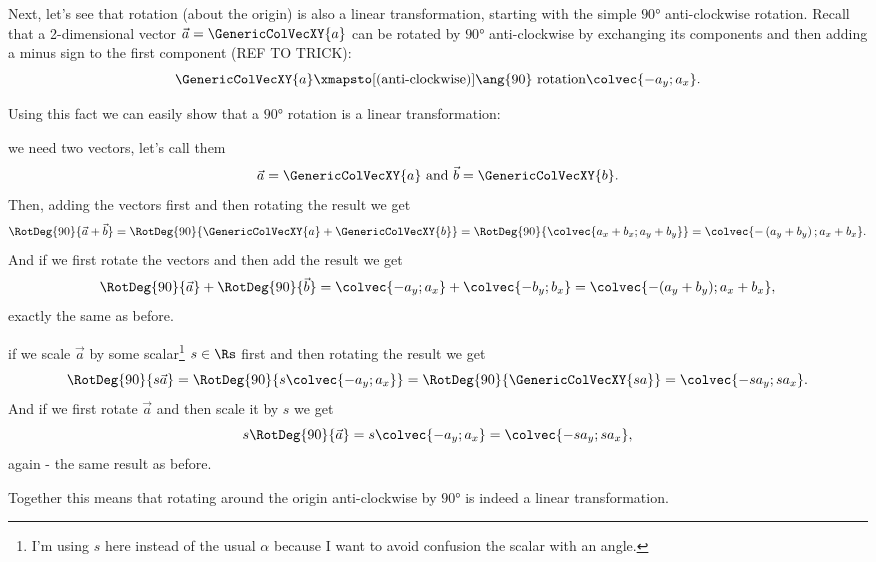 Next, let's see that rotation (about the origin) is also a linear transformation, starting with the simple $\ang{90}$ anti-clockwise rotation. Recall that a 2-dimensional vector $\vec{a}=\GenericColVecXY{a}$ can be rotated by $\ang{90}$ anti-clockwise by exchanging its components and then adding a minus sign to the first component (REF TO TRICK):
\begin{equation*}
	\GenericColVecXY{a} \xmapsto[\text{(anti-clockwise)}]{\ang{90}\ \text{rotation}} \colvec{-a_{y};a_{x}}.
\end{equation*}

Using this fact we can easily show that a $\ang{90}$ rotation is a linear transformation:
\begin{descitemize}
	\item[Additivity] we need two vectors, let's call them $$\vec{a}=\GenericColVecXY{a}\ \text{and}\ \vec{b}=\GenericColVecXY{b}.$$ Then, adding the vectors first and then rotating the result we get
	\begin{equation*}
		\RotDeg{90}{\vec{a}+\vec{b}} = \RotDeg{90}{\GenericColVecXY{a}+\GenericColVecXY{b}}
		= \RotDeg{90}{\colvec{a_{x}+b_{x};a_{y}+b_{y}}}
		= \colvec{-\left(a_{y}+b_{y}\right);a_{x}+b_{x}}.
	\end{equation*}
	And if we first rotate the vectors and then add the result we get
	\begin{equation*}
		\RotDeg{90}{\vec{a}} + \RotDeg{90}{\vec{b}} = \colvec{-a_{y};a_{x}}+\colvec{-b_{y};b_{x}} = \colvec{-(a_{y}+b_{y});a_{x}+b_{x}},
	\end{equation*}
	exactly the same as before.

	\item[Homogeneity] if we scale $\vec{a}$ by some scalar\footnote{I'm using $s$ here instead of the usual $\alpha$ because I want to avoid confusion the scalar with an angle.} $s\in\Rs$ first and then rotating the result we get
	\begin{equation*}
		\RotDeg{90}{s\vec{a}} = \RotDeg{90}{s\colvec{-a_{y};a_{x}}} = \RotDeg{90}{\GenericColVecXY{s a}} = \colvec{-s a_{y};s a_{x}}.
	\end{equation*}
	And if we first rotate $\vec{a}$ and then scale it by $s$ we get
	\begin{equation*}
		s \RotDeg{90}{\vec{a}} = s \colvec{-a_{y};a_{x}} = \colvec{-s a_{y};s a_{x}},
	\end{equation*}
	again - the same result as before.
\end{descitemize}
Together this means that rotating around the origin anti-clockwise by $\ang{90}$ is indeed a linear transformation.

